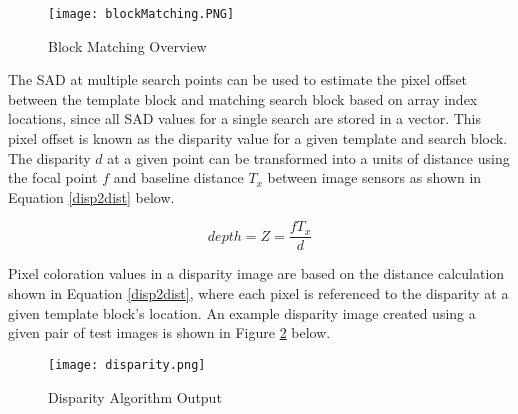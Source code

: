 \par
\begin{figure}[H]
	\centerline{\texttt{[image: blockMatching.PNG]}}
	\caption{Block Matching Overview \cite{collins}}
	\label{blockMatching}
\end{figure}
\par
The SAD at multiple search points can be used to estimate the pixel offset between the template block and matching search block based on array index locations, since all SAD values for a single search are stored in a vector. This pixel offset is known as the disparity value for a given template and search block. The disparity $d$ at a given point can be transformed into a units of distance using the focal point $f$ and baseline distance $T_x$ between image sensors as shown in Equation \ref{disp2dist} below. 
\par
\begin{equation}\label{disp2dist}
depth = Z = \frac{fT_x}{d}
\end{equation}
\par
Pixel coloration values in a disparity image are based on the distance calculation shown in Equation \ref{disp2dist}, where each pixel is referenced to the disparity at a given template block's location. An example disparity image created using a given pair of test images is shown in Figure \ref{disparityOutput} below. 
\par
\begin{figure}[H]
	\centerline{\texttt{[image: disparity.png]}}
	\caption{Disparity Algorithm Output}
	\label{disparityOutput}
\end{figure}
